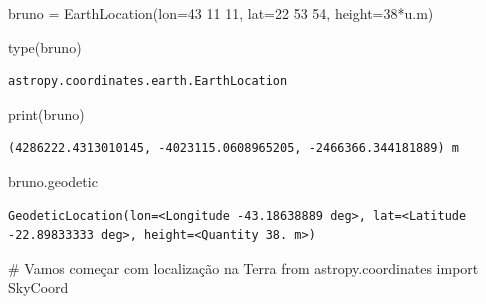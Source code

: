 \documentclass[
  letterpaper,
  DIV=11,
  numbers=noendperiod]{scrreprt}
\newenvironment{Shaded}{\begin{snugshade}}{\end{snugshade}}
\newcommand{\BuiltInTok}[1]{\textcolor[rgb]{0.00,0.23,0.31}{#1}}
\newcommand{\CommentTok}[1]{\textcolor[rgb]{0.37,0.37,0.37}{#1}}
\newcommand{\DecValTok}[1]{\textcolor[rgb]{0.68,0.00,0.00}{#1}}
\newcommand{\ImportTok}[1]{\textcolor[rgb]{0.00,0.46,0.62}{#1}}
\newcommand{\NormalTok}[1]{\textcolor[rgb]{0.00,0.23,0.31}{#1}}
\newcommand{\OperatorTok}[1]{\textcolor[rgb]{0.37,0.37,0.37}{#1}}
\newcommand{\StringTok}[1]{\textcolor[rgb]{0.13,0.47,0.30}{#1}}
\begin{document}
\begin{Shaded}
\begin{Highlighting}[]
\NormalTok{bruno }\OperatorTok{=}\NormalTok{ EarthLocation(lon}\OperatorTok{=}\StringTok{\textquotesingle{}{-}43 11 11\textquotesingle{}}\NormalTok{, }
\NormalTok{                      lat}\OperatorTok{=}\StringTok{\textquotesingle{}{-}22 53 54\textquotesingle{}}\NormalTok{, }
\NormalTok{                      height}\OperatorTok{=}\DecValTok{38}\OperatorTok{*}\NormalTok{u.m)}
\end{Highlighting}
\end{Shaded}

\begin{Shaded}
\begin{Highlighting}[]
\BuiltInTok{type}\NormalTok{(bruno)}
\end{Highlighting}
\end{Shaded}

\begin{verbatim}
astropy.coordinates.earth.EarthLocation
\end{verbatim}

\begin{Shaded}
\begin{Highlighting}[]
\BuiltInTok{print}\NormalTok{(bruno)}
\end{Highlighting}
\end{Shaded}

\begin{verbatim}
(4286222.4313010145, -4023115.0608965205, -2466366.344181889) m
\end{verbatim}

\begin{Shaded}
\begin{Highlighting}[]
\NormalTok{bruno.geodetic}
\end{Highlighting}
\end{Shaded}

\begin{verbatim}
GeodeticLocation(lon=<Longitude -43.18638889 deg>, lat=<Latitude -22.89833333 deg>, height=<Quantity 38. m>)
\end{verbatim}

\begin{Shaded}
\begin{Highlighting}[]
\CommentTok{\# Vamos começar com localização na Terra}
\ImportTok{from}\NormalTok{ astropy.coordinates }\ImportTok{import}\NormalTok{ SkyCoord}
\end{Highlighting}
\end{Shaded}
\end{document}
